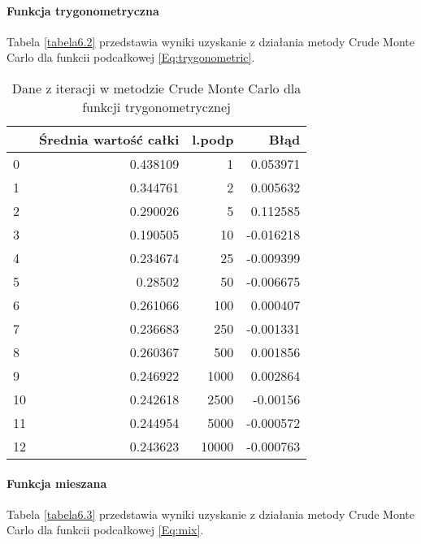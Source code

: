 \documentclass[12pt,twoside]{article}
\begin{document}
\paragraph{Funkcja trygonometryczna}

Tabela \eqref{tabela6.2} przedstawia wyniki uzyskanie z działania metody Crude Monte Carlo dla funkcii podcałkowej \eqref{Eq:trygonometric}.


\begin{table}[H]
\centering 
\caption{Dane z iteracji w metodzie Crude Monte Carlo dla funkcji trygonometrycznej}
\label{tabela6.2}
\begin{tabular}{lrrr}
\toprule
{} &  Średnia wartość całki &  l.podp &      Błąd \\
\midrule
0  &               0.438109 &       1 &  0.053971 \\
1  &               0.344761 &       2 &  0.005632 \\
2  &               0.290026 &       5 &  0.112585 \\
3  &               0.190505 &      10 & -0.016218 \\
4  &               0.234674 &      25 & -0.009399 \\
5  &                0.28502 &      50 & -0.006675 \\
6  &               0.261066 &     100 &  0.000407 \\
7  &               0.236683 &     250 & -0.001331 \\
8  &               0.260367 &     500 &  0.001856 \\
9  &               0.246922 &    1000 &  0.002864 \\
10 &               0.242618 &    2500 & -0.00156 \\
11 &               0.244954 &    5000 & -0.000572 \\
12 &               0.243623 &   10000 & -0.000763 \\
\bottomrule
\end{tabular}
\end{table}

\paragraph{Funkcja mieszana}

Tabela \eqref{tabela6.3} przedstawia wyniki uzyskanie z działania metody Crude Monte Carlo dla funkcii podcałkowej \eqref{Eq:mix}.
\end{document}
